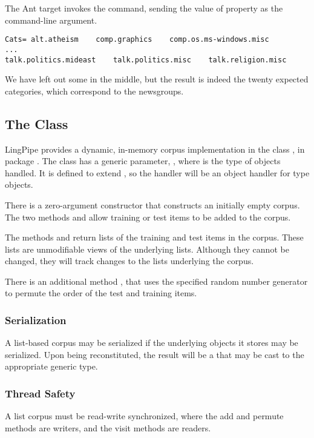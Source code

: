 The Ant target  invokes the
 command, sending the value of property
 as the command-line argument.
%
\begin{verbatim}
Cats= alt.atheism    comp.graphics    comp.os.ms-windows.misc
...
talk.politics.mideast    talk.politics.misc    talk.religion.misc
\end{verbatim}
%
We have left out some in the middle, but the result is indeed the
twenty expected categories, which correspond to the newsgroups.


\subsection{The  Class}

LingPipe provides a dynamic, in-memory corpus implementation in the
class , in package .  The
class has a generic parameter, , where  is
the type of objects handled.  It is defined to extend
, so the handler will be an object
handler for type  objects.

There is a zero-argument constructor  that
constructs an initially empty corpus.  The two methods
 and  allow training or test items
to be added to the corpus.

The methods  and  return lists of
the training and test items in the corpus.  These lists are
unmodifiable views of the underlying lists.  Although they cannot be
changed, they will track changes to the lists underlying the corpus.

There is an additional method , that uses
the specified random number generator to permute the order of the test
and training items.

\subsubsection{Serialization}

A list-based corpus may be serialized if the underlying objects
it stores may be serialized.  Upon being reconstituted, the result
will be a  that may be cast to the appropriate
generic type.

\subsubsection{Thread Safety}

A list corpus must be read-write synchronized, where the add
and permute methods are writers, and the visit methods are readers.
